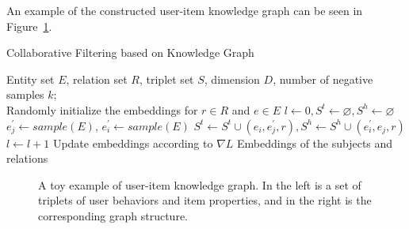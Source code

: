 \documentclass[algorithms,article,accept,moreauthors,pdftex,10pt,a4paper]{Definitions/mdpi}
\begin{document}
An example of the constructed user-item knowledge graph can be seen in Figure~\ref{example}.


\begin{algorithm}[t]
\caption{Collaborative Filtering based on Knowledge Graph}
\label{alg:A}
\begin{algorithmic}
\REQUIRE Entity set $E$, relation set $R$, triplet set $S$, dimension $D$, number of negative samples $k$;\\
\STATE Randomly initialize the embeddings for $r\in R$ and $e\in E$
\STATE $l \leftarrow 0, S^t \leftarrow \varnothing, S^h \leftarrow \varnothing$
\REPEAT
\STATE $e_j^\prime \gets sample(E)$, $e_i^\prime \gets sample(E)$  
\STATE $S^t \gets S^t \cup (e_i,e_j^\prime,r), S^h \gets S^h \cup (e_i^\prime,e_j,r)$ 
\STATE $l \gets l + 1$
\STATE Update embeddings according to $\nabla L$
\ENDFOR
\ENSURE Embeddings of the subjects and relations
\end{algorithmic}
\end{algorithm}





\begin{figure}[t!]
	\centering
	\setlength{\fboxrule}{0.pt}
	\setlength{\fboxsep}{0.pt}
	\vspace{-10pt}
	\caption{A toy example of user-item knowledge graph. In the left is a set of triplets of user behaviors and item properties, and in the right is the corresponding  graph structure.}
	\vspace{-15pt}
	\label{example}
\end{figure}
\end{document}
